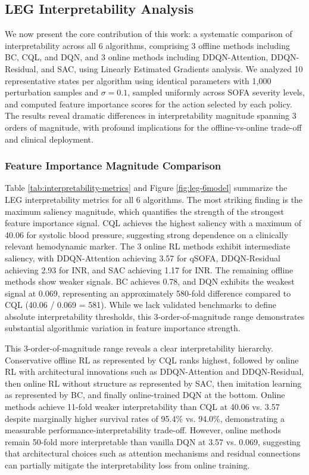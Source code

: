 \subsection{LEG Interpretability Analysis}\label{sec:results:leg}

We now present the core contribution of this work: a systematic comparison of interpretability across all 6 algorithms, comprising 3 offline methods including BC, CQL, and DQN, and 3 online methods including DDQN-Attention, DDQN-Residual, and SAC, using Linearly Estimated Gradients analysis. We analyzed 10 representative states per algorithm using identical parameters with 1,000 perturbation samples and $\sigma=0.1$, sampled uniformly across SOFA severity levels, and computed feature importance scores for the action selected by each policy. The results reveal dramatic differences in interpretability magnitude spanning 3 orders of magnitude, with profound implications for the offline-vs-online trade-off and clinical deployment.

\subsubsection{Feature Importance Magnitude Comparison}

Table \ref{tab:interpretability-metrics} and Figure \ref{fig:leg-6model} summarize the LEG interpretability metrics for all 6 algorithms. The most striking finding is the maximum saliency magnitude, which quantifies the strength of the strongest feature importance signal. CQL achieves the highest saliency with a maximum of 40.06 for systolic blood pressure, suggesting strong dependence on a clinically relevant hemodynamic marker. The 3 online RL methods exhibit intermediate saliency, with DDQN-Attention achieving 3.57 for qSOFA, DDQN-Residual achieving 2.93 for INR, and SAC achieving 1.17 for INR. The remaining offline methods show weaker signals. BC achieves 0.78, and DQN exhibits the weakest signal at 0.069, representing an approximately 580-fold difference compared to CQL (40.06 / 0.069 = 581). While we lack validated benchmarks to define absolute interpretability thresholds, this 3-order-of-magnitude range demonstrates substantial algorithmic variation in feature importance strength.

This 3-order-of-magnitude range reveals a clear interpretability hierarchy. Conservative offline RL as represented by CQL ranks highest, followed by online RL with architectural innovations such as DDQN-Attention and DDQN-Residual, then online RL without structure as represented by SAC, then imitation learning as represented by BC, and finally online-trained DQN at the bottom. Online methods achieve 11-fold weaker interpretability than CQL at 40.06 vs. 3.57 despite marginally higher survival rates of 95.4\% vs. 94.0\%, demonstrating a measurable performance-interpretability trade-off. However, online methods remain 50-fold more interpretable than vanilla DQN at 3.57 vs. 0.069, suggesting that architectural choices such as attention mechanisms and residual connections can partially mitigate the interpretability loss from online training.

